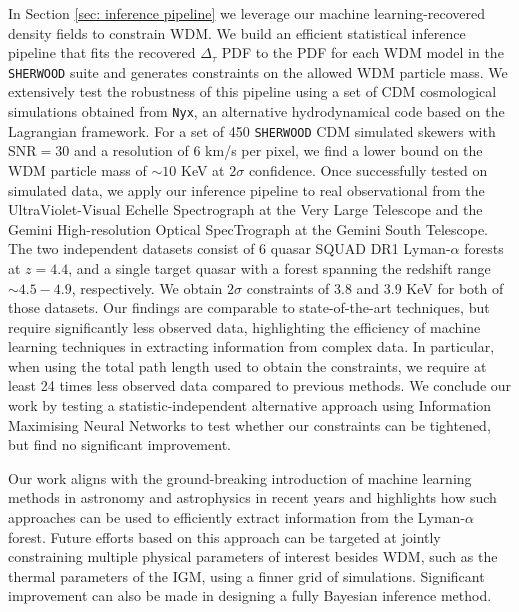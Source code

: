 In Section \ref{sec: inference pipeline} we leverage our machine learning-recovered density fields to constrain WDM. We build an efficient statistical inference pipeline that fits the recovered $\Delta_\tau$ PDF to the PDF for each WDM model in the \texttt{SHERWOOD} suite and generates constraints on the allowed WDM particle mass. We extensively test the robustness of this pipeline using a set of CDM cosmological simulations obtained from \texttt{Nyx}, an alternative hydrodynamical code based on the Lagrangian framework. For a set of 450 \texttt{SHERWOOD} CDM simulated skewers with SNR$=30$ and a resolution of $6$ km/s per pixel, we find a lower bound on the WDM particle mass of $\sim 10$ KeV at $2\sigma$ confidence. Once successfully tested on simulated data, we apply our inference pipeline to real observational from the UltraViolet-Visual Echelle Spectrograph at the Very Large Telescope and the Gemini High-resolution Optical SpecTrograph at the Gemini South Telescope. The two independent datasets consist of 6 quasar SQUAD DR1 Lyman-$\alpha$ forests at $z=4.4$, and a single target quasar with a forest spanning the redshift range $\sim 4.5-4.9$, respectively. We obtain $2\sigma$ constraints of 3.8 and 3.9 KeV for both of those datasets. Our findings are comparable to state-of-the-art techniques, but require significantly less observed data, highlighting the efficiency of machine learning techniques in extracting information from complex data. In particular, when using the total path length used to obtain the constraints, we require at least 24 times less observed data compared to previous methods. We conclude our work by testing a statistic-independent alternative approach using Information Maximising Neural Networks to test whether our constraints can be tightened, but find no significant improvement.

Our work aligns with the ground-breaking introduction of machine learning methods in astronomy and astrophysics in recent years and highlights how such approaches can be used to efficiently extract information from the Lyman-$\alpha$ forest. Future efforts based on this approach can be targeted at jointly constraining multiple physical parameters of interest besides WDM, such as the thermal parameters of the IGM, using a finner grid of simulations. Significant improvement can also be made in designing a fully Bayesian inference method.